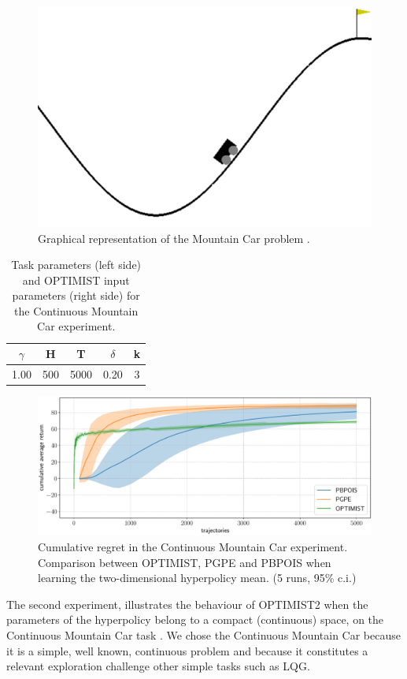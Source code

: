 \begin{figure}[t!] 
\centering
\includegraphics[width=.6\textwidth,keepaspectratio]{Images/MC.png}
\caption{Graphical representation of the Mountain Car problem \cite{brockman2016openai}.} 
\label{fig:MC}
\end{figure} 

\begin{table}[t!]
\centering
\begin{tabular}{ccc|cc} 
\toprule
$\gamma$ & H & T & $\delta$ & k\\ 
\midrule
1.00 & 500 & 5000 & 0.20 & 3\\
\bottomrule
\end{tabular}
\caption{Task parameters (left side) and \gls{OPTIMIST} input parameters (right side) for the Continuous Mountain Car experiment.}
\label{tab:MCcoeff}
\end{table}

\begin{figure}[t!] 
\centering
\includegraphics[width=\textwidth,height=\textheight,keepaspectratio]{Images/MC_mu.pdf}
\caption{Cumulative regret in
the Continuous Mountain Car experiment. Comparison between
\gls{OPTIMIST}, \gls{PGPE} and \gls{PBPOIS} when learning the two-dimensional hyperpolicy mean.
(5 runs, 95\% c.i.)} 
\label{fig:MCcomparison} 
\end{figure}

The second experiment, illustrates the behaviour of \gls{OPTIMIST}2  
when the parameters of the hyperpolicy belong to a compact (continuous) space, on the Continuous Mountain Car task \cite{brockman2016openai}. We chose the Continuous Mountain Car because it is a simple, well known, continuous problem and because it constitutes a relevant exploration challenge \wrt other simple tasks such as \gls{LQG}. 

